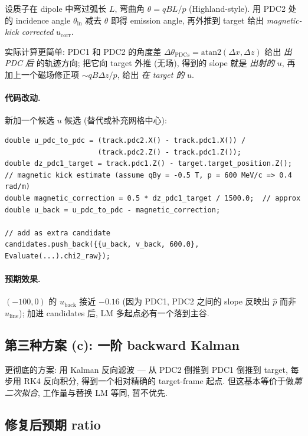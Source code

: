 设质子在 dipole 中弯过弧长 $L$, 弯曲角 $\theta = qBL / p$ (Highland-style). 用 PDC2 处的 incidence angle $\theta_{\mathrm{in}}$ 减去 $\theta$ 即得 emission angle, 再外推到 target 给出 \emph{magnetic-kick corrected} $u_{\mathrm{corr}}$.

实际计算更简单: PDC1 和 PDC2 的角度差 $\Delta\theta_{\mathrm{PDCs}} = \mathrm{atan2}(\Delta x, \Delta z)$ 给出 \emph{出 PDC 后} 的轨迹方向; 把它向 target 外推 (无场), 得到的 slope 就是 \emph{出射的} $u$, 再加上一个磁场修正项 $\sim qB\Delta z / p$, 给出 \emph{在 target 的} $u$.

\paragraph{代码改动.}
新加一个候选 $u$ 候选 (替代或补充网格中心):
\begin{lstlisting}[caption={magnetic-kick-corrected 起点 (建议改动)}]
double u_pdc_to_pdc = (track.pdc2.X() - track.pdc1.X()) /
                      (track.pdc2.Z() - track.pdc1.Z());
double dz_pdc1_target = track.pdc1.Z() - target.target_position.Z();
// magnetic kick estimate (assume qBy = -0.5 T, p = 600 MeV/c => 0.4 rad/m)
double magnetic_correction = 0.5 * dz_pdc1_target / 1500.0;  // approx
double u_back = u_pdc_to_pdc - magnetic_correction;

// add as extra candidate
candidates.push_back({{u_back, v_back, 600.0}, Evaluate(...).chi2_raw});
\end{lstlisting}

\paragraph{预期效果.}
$(-100, 0)$ 的 $u_{\mathrm{back}}$ 接近 $-0.16$ (因为 PDC1, PDC2 之间的 slope 反映出 $\hat p$ 而非 $u_{\mathrm{line}}$); 加进 candidates 后, LM 多起点必有一个落到主谷.

\subsection{第三种方案 (c): 一阶 backward Kalman}
\label{sec:partIII:basin:fix_c}

更彻底的方案: 用 Kalman 反向滤波 — 从 PDC2 倒推到 PDC1 倒推到 target, 每步用 RK4 反向积分, 得到一个相对精确的 target-frame 起点. 但这基本等价于做\emph{第二次拟合}, 工作量与替换 LM 等同, 暂不优先.

\subsection{修复后预期 ratio}
\label{sec:partIII:basin:fix_expected}

